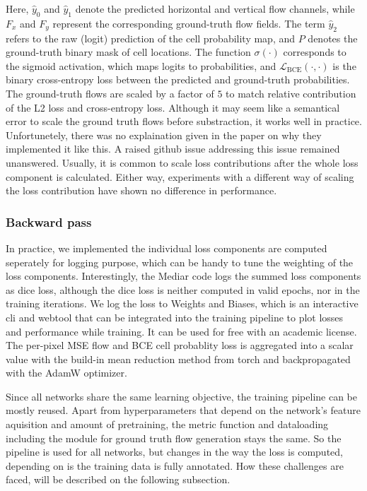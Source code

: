Here, $\hat{y}_0$ and $\hat{y}_1$ denote the predicted horizontal and vertical flow channels, while $F_x$ and $F_y$ represent the corresponding ground-truth flow fields. The term $\hat{y}_2$ refers to the raw (logit) prediction of the cell probability map, and $P$ denotes the ground-truth binary mask of cell locations. The function $\sigma(\cdot)$ corresponds to the sigmoid activation, which maps logits to probabilities, and $\mathcal{L}_{\text{BCE}}(\cdot,\cdot)$ is the binary cross-entropy loss between the predicted and ground-truth probabilities. The ground-truth flows are scaled by a factor of $5$ to match relative contribution of the L2 loss and cross-entropy loss. Although it may seem like a semantical error to scale the ground truth flows before substraction, it works well in practice. Unfortunetely, there was no explaination given in the paper on why they implemented it like this. A raised github issue addressing this issue remained unanswered. Usually, it is common to scale loss contributions after the whole loss component is calculated. Either way, experiments with a different way of scaling the loss contribution have shown no difference in performance. 


\subsubsection{Backward pass}


In practice, we implemented the individual loss components are computed seperately for logging purpose, which can be handy to tune the weighting of the loss components. Interestingly, the Mediar code logs the summed loss components as dice loss, although the dice loss is neither computed in valid epochs, nor in the training iterations. We log the loss to Weights and Biases, which is an interactive cli and webtool that can be integrated into the training pipeline to plot losses and performance while training. It can be used for free with an academic license. The per-pixel MSE flow and BCE cell probablity loss is aggregated into a scalar value with the build-in mean reduction method from torch and backpropagated with the AdamW optimizer.

\vspace{1em} %

Since all networks share the same learning objective, the training pipeline can be mostly reused. Apart from hyperparameters that depend on the network's feature aquisition and amount of pretraining, the metric function and dataloading including the module for ground truth flow generation stays the same. So the pipeline is used for all networks, but  changes in the way the loss is computed, depending on is the training data is fully annotated. How these challenges are faced, will be described on the following subsection.


